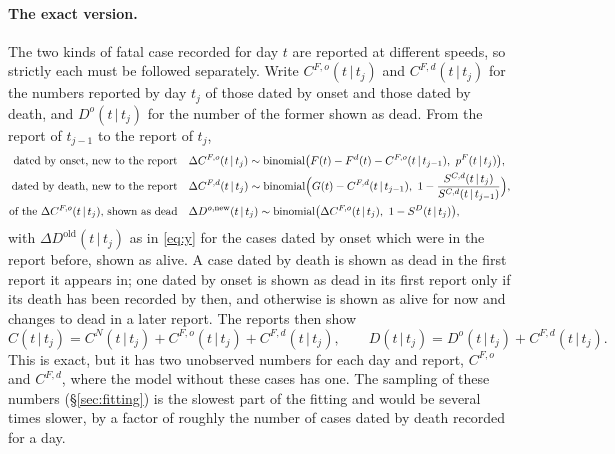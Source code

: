 \documentclass[11pt,a4paper]{article}
\newcommand{\given}{\,|\,}
\newcommand{\bin}{\operatorname{binomial}}
\newcommand{\dold}{\Delta D^{\mathrm{old}}}
\begin{document}
\paragraph{The exact version.} The two kinds of fatal case recorded for day
$t$ are reported at different speeds, so strictly each must be followed
separately. Write $C^{F,o}(t\given t_j)$ and $C^{F,d}(t\given t_j)$ for the
numbers reported by day $t_j$ of those dated by onset and those dated by
death, and $D^{o}(t\given t_j)$ for the number of the former shown as dead.
From the report of $t_{j-1}$ to the report of $t_j$,
\begin{align}
\text{dated by onset, new to the report}\quad
 & \Delta C^{F,o}(t\given t_j)\sim\bin\bigl(F(t)-F^{d}(t)-C^{F,o}(t\given t_{j-1}),\ p^{F}(t\given t_j)\bigr),
 \label{eq:ao}\\
\text{dated by death, new to the report}\quad
 & \Delta C^{F,d}(t\given t_j)\sim\bin\Bigl(G(t)-C^{F,d}(t\given t_{j-1}),\
 1-\frac{S^{C,d}(t\given t_j)}{S^{C,d}(t\given t_{j-1})}\Bigr),
 \label{eq:ad}\\
\text{of the $\Delta C^{F,o}(t\given t_j)$, shown as dead}\quad
 & \Delta D^{o,\mathrm{new}}(t\given t_j)\sim\bin\bigl(\Delta C^{F,o}(t\given t_j),\ 1-S^{D}(t\given t_j)\bigr),
 \label{eq:xo}
\end{align}
with $\dold(t\given t_j)$ as in \eqref{eq:y} for the cases dated by onset
which were in the report before, shown as alive. A case dated by death is shown as
dead in the first report it appears in; one dated by onset is shown as dead
in its first report only if its death has been recorded by then, and
otherwise is shown as alive for now and changes to dead in a later report.
The reports then show
\[
C(t\given t_j)=C^{N}(t\given t_j)+C^{F,o}(t\given t_j)+C^{F,d}(t\given t_j),\qquad
D(t\given t_j)=D^{o}(t\given t_j)+C^{F,d}(t\given t_j).
\]
This is exact, but it has two unobserved numbers for each day and report,
$C^{F,o}$ and $C^{F,d}$, where the model without these cases has one. The
sampling of these numbers (\S\ref{sec:fitting}) is the slowest part of the
fitting and would be several times slower, by a factor of roughly the
number of cases dated by death recorded for a day.
\end{document}
